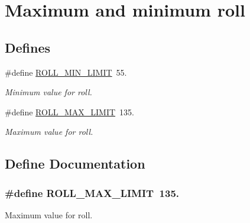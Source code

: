 \hypertarget{group___r_o_l_l___l_i_m_i_t_s}{\section{\-Maximum and minimum roll}
\label{group___r_o_l_l___l_i_m_i_t_s}
}
\subsection*{\-Defines}
\begin{DoxyCompactItemize}
\item 
\#define \hyperlink{group___r_o_l_l___l_i_m_i_t_s_gae368a108e75a5b699e83ad3abeafe0cb}{\-R\-O\-L\-L\-\_\-\-M\-I\-N\-\_\-\-L\-I\-M\-I\-T}~55.
\begin{DoxyCompactList}\small\item\em \-Minimum value for roll. \end{DoxyCompactList}\item 
\#define \hyperlink{group___r_o_l_l___l_i_m_i_t_s_ga7428d6dfaaef5ae9e043eedcaeba8ec7}{\-R\-O\-L\-L\-\_\-\-M\-A\-X\-\_\-\-L\-I\-M\-I\-T}~135.
\begin{DoxyCompactList}\small\item\em \-Maximum value for roll. \end{DoxyCompactList}\end{DoxyCompactItemize}


\subsection{\-Define \-Documentation}
\hypertarget{group___r_o_l_l___l_i_m_i_t_s_ga7428d6dfaaef5ae9e043eedcaeba8ec7}{
\subsubsection[{\-R\-O\-L\-L\-\_\-\-M\-A\-X\-\_\-\-L\-I\-M\-I\-T}]{\setlength{\rightskip}{0pt plus 5cm}\#define {\bf \-R\-O\-L\-L\-\_\-\-M\-A\-X\-\_\-\-L\-I\-M\-I\-T}~135.}}\label{group___r_o_l_l___l_i_m_i_t_s_ga7428d6dfaaef5ae9e043eedcaeba8ec7}


\-Maximum value for roll. 

